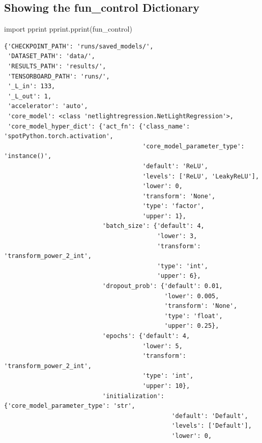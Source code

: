 \documentclass[
  letterpaper,
  DIV=11,
  numbers=noendperiod]{scrreprt}
\newenvironment{Shaded}{\begin{snugshade}}{\end{snugshade}}
\newcommand{\ImportTok}[1]{\textcolor[rgb]{0.00,0.46,0.62}{#1}}
\newcommand{\NormalTok}[1]{\textcolor[rgb]{0.00,0.23,0.31}{#1}}
\begin{document}
\subsection{Showing the fun\_control
Dictionary}\label{sec-show-fun-control-31}

\begin{Shaded}
\begin{Highlighting}[]
\ImportTok{import}\NormalTok{ pprint}
\NormalTok{pprint.pprint(fun\_control)}
\end{Highlighting}
\end{Shaded}

\begin{verbatim}
{'CHECKPOINT_PATH': 'runs/saved_models/',
 'DATASET_PATH': 'data/',
 'RESULTS_PATH': 'results/',
 'TENSORBOARD_PATH': 'runs/',
 '_L_in': 133,
 '_L_out': 1,
 'accelerator': 'auto',
 'core_model': <class 'netlightregression.NetLightRegression'>,
 'core_model_hyper_dict': {'act_fn': {'class_name': 'spotPython.torch.activation',
                                      'core_model_parameter_type': 'instance()',
                                      'default': 'ReLU',
                                      'levels': ['ReLU', 'LeakyReLU'],
                                      'lower': 0,
                                      'transform': 'None',
                                      'type': 'factor',
                                      'upper': 1},
                           'batch_size': {'default': 4,
                                          'lower': 3,
                                          'transform': 'transform_power_2_int',
                                          'type': 'int',
                                          'upper': 6},
                           'dropout_prob': {'default': 0.01,
                                            'lower': 0.005,
                                            'transform': 'None',
                                            'type': 'float',
                                            'upper': 0.25},
                           'epochs': {'default': 4,
                                      'lower': 5,
                                      'transform': 'transform_power_2_int',
                                      'type': 'int',
                                      'upper': 10},
                           'initialization': {'core_model_parameter_type': 'str',
                                              'default': 'Default',
                                              'levels': ['Default'],
                                              'lower': 0,

\end{verbatim}
\end{document}
